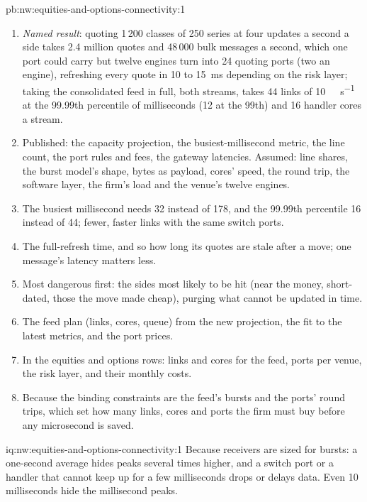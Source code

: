 \begin{solution}{pb:nw:equities-and-options-connectivity:1}
\begin{enumerate}[resume]
\item \emph{Named result}: quoting 1\,200 classes of 250 series at four updates a second a side takes 2.4 million quotes and 48\,000
  bulk messages a second, which one port could carry but twelve engines turn into 24 quoting ports (two an engine), refreshing every
  quote in 10 to \qty{15}{\milli\second} depending on the risk layer; taking the consolidated feed in full, both streams, takes 44
  links of \qty{10}{\giga\bit\per\second} at the 99.99th percentile of milliseconds (12 at the 99th) and 16 handler cores a stream.
\item Published: the capacity projection, the busiest-millisecond metric, the line count, the port rules and fees, the gateway
  latencies. Assumed: line shares, the burst model's shape, bytes as payload, cores' speed, the round trip, the software layer, the
  firm's load and the venue's twelve engines.
\item The busiest millisecond needs 32 instead of 178, and the 99.99th percentile 16 instead of 44; fewer, faster links with the
  same switch ports.
\item The full-refresh time, and so how long its quotes are stale after a move; one message's latency matters less.
\item Most dangerous first: the sides most likely to be hit (near the money, short-dated, those the move made cheap), purging what
  cannot be updated in time.
\item The feed plan (links, cores, queue) from the new projection, the fit to the latest metrics, and the port prices.
\item In the equities and options rows: links and cores for the feed, ports per venue, the risk layer, and their monthly costs.
\item Because the binding constraints are the feed's bursts and the ports' round trips, which set how many links, cores and ports the
  firm must buy before any microsecond is saved.
\end{enumerate}
\end{solution}

\begin{solution}{iq:nw:equities-and-options-connectivity:1}
Because receivers are sized for bursts: a one-second average hides peaks several times higher, and a switch port or a handler that
cannot keep up for a few milliseconds drops or delays data. Even 10 milliseconds hide the millisecond peaks.
\end{solution}

